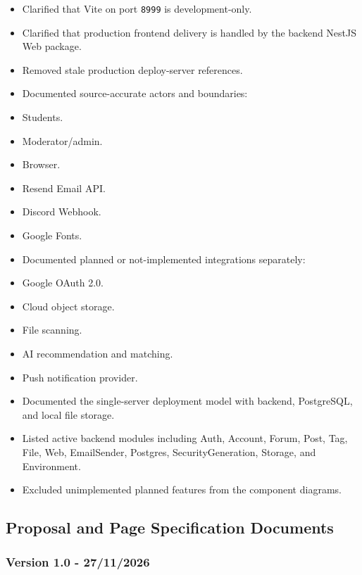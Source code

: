 \documentclass[12pt]{article}
\begin{document}
\begin{itemize}
\item Clarified that Vite on port \texttt{8999} is development-only.
\item Clarified that production frontend delivery is handled by the backend NestJS Web package.
\item Removed stale production deploy-server references.
\item Documented source-accurate actors and boundaries:
\item Students.
\item Moderator/admin.
\item Browser.
\item Resend Email API.
\item Discord Webhook.
\item Google Fonts.
\item Documented planned or not-implemented integrations separately:
\item Google OAuth 2.0.
\item Cloud object storage.
\item File scanning.
\item AI recommendation and matching.
\item Push notification provider.
\item Documented the single-server deployment model with backend, PostgreSQL, and local file storage.
\item Listed active backend modules including Auth, Account, Forum, Post, Tag, File, Web, EmailSender, Postgres, SecurityGeneration, Storage, and Environment.
\item Excluded unimplemented planned features from the component diagrams.
\end{itemize}
\par\medskip

\hypertarget{sec:proposal-and-page-specification-documents}{}
\subsection*{Proposal and Page Specification Documents}
\par\medskip

\hypertarget{sec:version-1-0-27-11-2026}{}
\subsubsection*{Version 1.0 - 27/11/2026}
\par\medskip
\end{document}
